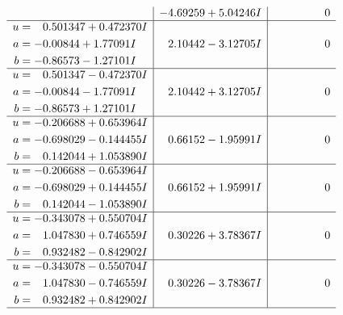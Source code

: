 \documentclass[1p]{elsarticle_modified}
\theoremstyle{definition}
\begin{document}
$$\begin{array}{c|c|c}
 & -4.69259 + 5.04246 I & \phantom{-0.000000 } 0 \\ \hline\begin{aligned}
u &= \phantom{-}0.501347 + 0.472370 I \\
a &= -0.00844 + 1.77091 I \\
b &= -0.86573 - 1.27101 I\end{aligned}
 & \phantom{-}2.10442 - 3.12705 I & \phantom{-0.000000 } 0 \\ \hline\begin{aligned}
u &= \phantom{-}0.501347 - 0.472370 I \\
a &= -0.00844 - 1.77091 I \\
b &= -0.86573 + 1.27101 I\end{aligned}
 & \phantom{-}2.10442 + 3.12705 I & \phantom{-0.000000 } 0 \\ \hline\begin{aligned}
u &= -0.206688 + 0.653964 I \\
a &= -0.698029 - 0.144455 I \\
b &= \phantom{-}0.142044 + 1.053890 I\end{aligned}
 & \phantom{-}0.66152 - 1.95991 I & \phantom{-0.000000 } 0 \\ \hline\begin{aligned}
u &= -0.206688 - 0.653964 I \\
a &= -0.698029 + 0.144455 I \\
b &= \phantom{-}0.142044 - 1.053890 I\end{aligned}
 & \phantom{-}0.66152 + 1.95991 I & \phantom{-0.000000 } 0 \\ \hline\begin{aligned}
u &= -0.343078 + 0.550704 I \\
a &= \phantom{-}1.047830 + 0.746559 I \\
b &= \phantom{-}0.932482 - 0.842902 I\end{aligned}
 & \phantom{-}0.30226 + 3.78367 I & \phantom{-0.000000 } 0 \\ \hline\begin{aligned}
u &= -0.343078 - 0.550704 I \\
a &= \phantom{-}1.047830 - 0.746559 I \\
b &= \phantom{-}0.932482 + 0.842902 I\end{aligned}
 & \phantom{-}0.30226 - 3.78367 I & \phantom{-0.000000 } 0\\
 \hline 
 \end{array}$$\newpage$$\begin{array}{c|c|c}  

\end{array}$$
\end{document}

